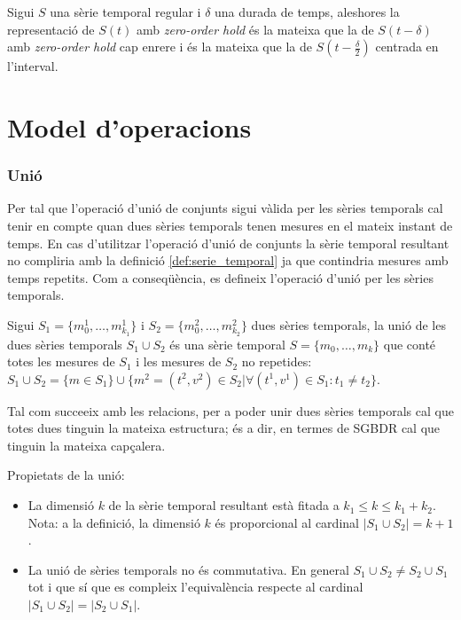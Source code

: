 Sigui $S$ una sèrie temporal regular i $\delta$ una durada de temps, aleshores la representació de $S(t)$ amb \emph{zero-order hold} és la mateixa que la de $S(t-\delta)$ amb \emph{zero-order hold} cap enrere i és la mateixa que la de $S(t-\frac{\delta}{2})$ centrada en l'interval. 







\section{Model d'operacions}






\subsubsection{Unió}

Per tal que l'operació d'unió de conjunts sigui vàlida per les sèries
temporals cal tenir en compte quan dues sèries temporals tenen mesures
en el mateix instant de temps. En cas d'utilitzar l'operació d'unió de
conjunts la sèrie temporal resultant no compliria amb la definició
\ref{def:serie_temporal} ja que contindria mesures amb temps
repetits. Com a conseqüència, es defineix l'operació d'unió per les
sèries temporals.

\begin{definition}[unió]
  Sigui $S_1=\{m_0^1, \dotsc, m_{k_1}^1\}$ i $S_2=\{m_0^2, \dotsc,
  m_{k_2}^2\}$ dues sèries temporals, la unió de les dues sèries
  temporals $S_1 \cup S_2$ és una sèrie temporal $S=\{m_0, \dotsc,
  m_k\}$ que conté totes les mesures de $S_1$ i les mesures de $S_2$
  no repetides: $S_1 \cup S_2 = \{ m \in S_1 \} \cup \{ m^2 =
  (t^2,v^2) \in S_2 | \forall (t^1,v^1)\in S_1 : t_1 \neq t_2
  \}$. 

  Tal com succeeix amb les relacions, per a poder unir dues sèries
  temporals cal que totes dues tinguin la mateixa estructura; és a dir,
  en termes de SGBDR cal que tinguin la mateixa capçalera.
\end{definition}

Propietats de la unió:

\begin{itemize}
\item La dimensió $k$ de la sèrie temporal resultant està fitada a
  $k_1 \leq k \leq k_1 + k_2$. Nota: a la definició, la dimensió $k$ és
  proporcional al cardinal $|S_1\cup S_2| = k+1$.
\item La unió de sèries temporals no és commutativa. En general
  $S_1\cup S_2 \neq S_2\cup S_1$ tot i que sí que es compleix
  l'equivalència respecte al cardinal $|S_1\cup S_2| = |S_2\cup S_1|$.
\end{itemize}



